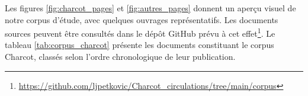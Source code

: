 \begin{table}[h]
	\small
	\centering
	\caption{Description de notre corpus d'étude.}
	\label{tab:corpus}
\end{table}

Les figures \ref{fig:charcot_pages} et \ref{fig:autres_pages} donnent un aperçu visuel de notre corpus d'étude, avec quelques ouvrages représentatifs. Les documents sources peuvent être consultés dans le dépôt GitHub prévu à cet effet\footnote{\url{https://github.com/ljpetkovic/Charcot_circulations/tree/main/corpus}}. Le tableau \ref{tab:corpus_charcot} présente les documents constituant le corpus Charcot, classés selon l'ordre chronologique de leur publication.
	
\begingroup
\renewcommand{\arraystretch}{1.5}  %

